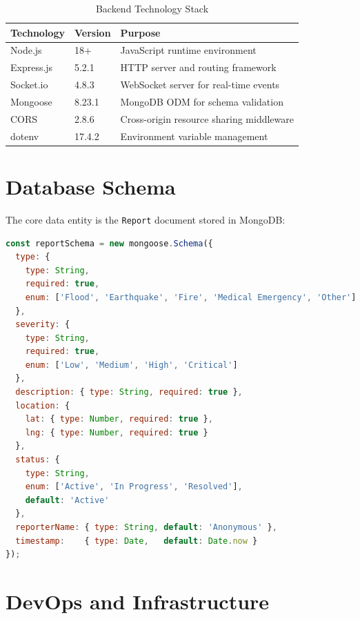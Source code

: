 \documentclass[12pt, a4paper]{report}
\begin{document}
\begin{table}[H]
  \centering
  \caption{Backend Technology Stack}
  \begin{tabularx}{\textwidth}{l l X}
    \toprule
    \rowcolor{headerrow!20}
    \textbf{Technology} & \textbf{Version} & \textbf{Purpose} \\
    \midrule
    Node.js     & 18+    & JavaScript runtime environment \\
    \rowcolor{rowshade}
    Express.js  & 5.2.1  & HTTP server and routing framework \\
    Socket.io   & 4.8.3  & WebSocket server for real-time events \\
    \rowcolor{rowshade}
    Mongoose    & 8.23.1 & MongoDB ODM for schema validation \\
    CORS        & 2.8.6  & Cross-origin resource sharing middleware \\
    \rowcolor{rowshade}
    dotenv      & 17.4.2 & Environment variable management \\
    \bottomrule
  \end{tabularx}
\end{table}

\section{Database Schema}

The core data entity is the \texttt{Report} document stored in MongoDB:

\begin{lstlisting}[language=JavaScript, caption={MongoDB Report Schema (models/Report.js)}]
const reportSchema = new mongoose.Schema({
  type: {
    type: String,
    required: true,
    enum: ['Flood', 'Earthquake', 'Fire', 'Medical Emergency', 'Other']
  },
  severity: {
    type: String,
    required: true,
    enum: ['Low', 'Medium', 'High', 'Critical']
  },
  description: { type: String, required: true },
  location: {
    lat: { type: Number, required: true },
    lng: { type: Number, required: true }
  },
  status: {
    type: String,
    enum: ['Active', 'In Progress', 'Resolved'],
    default: 'Active'
  },
  reporterName: { type: String, default: 'Anonymous' },
  timestamp:    { type: Date,   default: Date.now }
});
\end{lstlisting}

\section{DevOps and Infrastructure}
\end{document}
